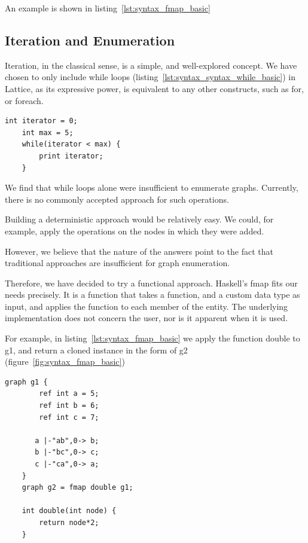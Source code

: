 An example is shown in listing~\ref{lst:syntax_fmap_basic}

\subsection{Iteration and Enumeration}\label{subsec:syntax_iteration-and-enumeration}
Iteration, in the classical sense, is a simple, and well-explored concept.
We have chosen to only include while loops (listing~\ref{lst:syntax_syntax_while_basic})
in Lattice, as its expressive power, is equivalent to any other constructs, such as for, or foreach.

\begin{lstlisting}[caption={Simple while loop.},captionpos=b,label={lst:syntax_syntax_while_basic}]
    int iterator = 0;
    int max = 5;
    while(iterator < max) {
        print iterator;
    }
\end{lstlisting}


We find that while loops alone were insufficient to enumerate graphs.
Currently, there is no commonly accepted approach
for such operations.

Building a deterministic approach would be relatively easy.
We could, for example, apply the operations on the nodes in which
they were added.

However, we believe that the nature of the answers point to the fact that traditional approaches are insufficient for graph
enumeration.

Therefore, we have decided to try a functional approach.
Haskell's fmap fits our needs precisely.
It is a function that takes a function, and a custom data type as input, and applies the function to each member of
the entity.
The underlying implementation does not concern the user, nor is it apparent when it is used.

For example, in listing~\ref{lst:syntax_fmap_basic} we apply the function double to g1, and return a cloned instance
in the form of g2 (figure~\ref{fig:syntax_fmap_basic})

\begin{lstlisting}[caption={Simple fmap application on a graph.},captionpos=b,label={lst:syntax_fmap_basic}]
    graph g1 {
        ref int a = 5;
        ref int b = 6;
        ref int c = 7;

       a |-"ab",0-> b;
       b |-"bc",0-> c;
       c |-"ca",0-> a;
    }
    graph g2 = fmap double g1;

    int double(int node) {
        return node*2;
    }
\end{lstlisting}

